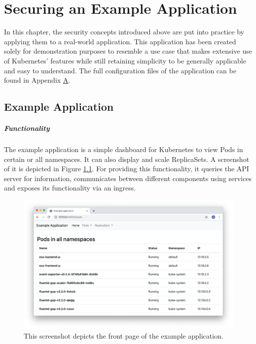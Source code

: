 \chapter{Securing an Example Application} \label{chap:example}

In this chapter, the security concepts introduced above are put into practice by applying them to a real-world application. This application has been created solely for demonstration purposes to resemble a use case that makes extensive use of Kubernetes' features while still retaining simplicity to be generally applicable and easy to understand. The full configuration files of the application can be found in Appendix \hyperref[apx:A]{A}.

\section{Example Application}

\paragraph{Functionality}

The example application is a simple dashboard for Kubernetes to view Pods in certain or all namespaces. It can also display and scale ReplicaSets. A screenshot of it is depicted in Figure \ref{fig:exaScreenshot}. For providing this functionality, it queries the API server for information, communicates between different components using services and exposes its functionality via an ingress. 

\begin{figure}[H]
\begin{center}
    \includegraphics[width=1.0\linewidth]{figures/exa_screenshot.png}
    \caption[Screenshot of the example application]{This screenshot depicts the front page of the example application.}
    \label{fig:exaScreenshot}
\end{center}
\end{figure}

